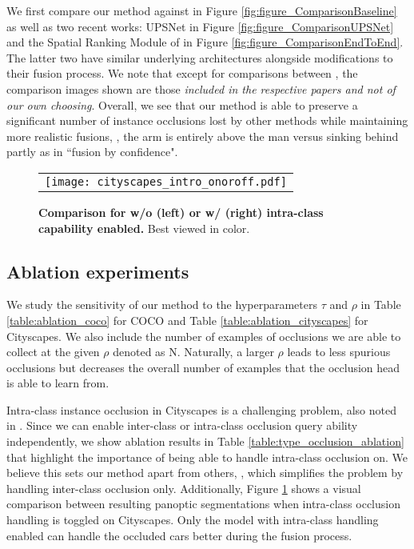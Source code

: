 \documentclass[10pt,twocolumn,letterpaper]{article}
\begin{document}
We first compare our method against \cite{kirillov2019panoptic} in Figure \ref{fig:figure_ComparisonBaseline} as well as two recent works: UPSNet \cite{xiong2019upsnet} in Figure \ref{fig:figure_ComparisonUPSNet} and the Spatial Ranking Module of \cite{liu2019end} in Figure \ref{fig:figure_ComparisonEndToEnd}. The latter two have similar underlying architectures alongside modifications to their fusion process. We note that except for comparisons between \cite{kirillov2019panoptic}, the comparison images shown are those \textit{included in the respective papers and not of our own choosing}. Overall, we see that our method is able to preserve a significant number of instance occlusions lost by other methods while maintaining more realistic fusions, \eg, the arm is entirely above the man versus sinking behind partly as in ``fusion by confidence".

\vspace{1mm}




\begin{figure}[!htp]
\begin{center}
\begin{tabular} {c}
\texttt{[image: cityscapes\_intro\_onoroff.pdf]}
\end{tabular}
\end{center}
\vspace{-7mm}
\caption{\textbf{Comparison for w/o (left) or w/ (right) intra-class capability enabled.} Best viewed in color.} 
\vspace{-3mm}
\label{fig:intra-class-cityscapes}
\end{figure}


\subsection{Ablation experiments} \label{sec:ablation}

We study the sensitivity of our method to the hyperparameters $\tau$ and $\rho$ in Table \ref{table:ablation_coco} for COCO and Table \ref{table:ablation_cityscapes} for Cityscapes. We also include the number of examples of occlusions we are able to collect at the given $\rho$ denoted as N. Naturally, a larger $\rho$ leads to less spurious occlusions but decreases the overall number of examples that the occlusion head is able to learn from.

Intra-class instance occlusion in Cityscapes is a challenging problem, also noted in \cite{he2017mask}. Since we can enable inter-class or intra-class occlusion query ability independently, we show ablation results in Table \ref{table:type_occlusion_ablation} that highlight the importance of being able to handle intra-class occlusion on. We believe this sets our method apart from others, \eg, \cite{liu2019end} which simplifies the problem by handling inter-class occlusion only. Additionally, Figure \ref{fig:intra-class-cityscapes} shows a visual comparison between resulting panoptic segmentations when intra-class occlusion handling is toggled on Cityscapes. Only the model with intra-class handling enabled can handle the occluded cars better during the fusion process.
\end{document}
